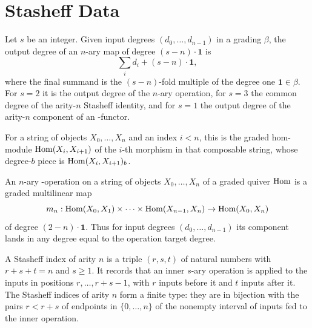 
\chapter{Stasheff Data}

\begin{definition}
\label{AInfinityTheory.targetDeg}
\leanok
{}
Let $s$ be an integer. Given input degrees $(d_0,\dots,d_{n-1})$ in a grading $\beta$, the
output degree of an $n$-ary map of degree $(s-n) \cdot \mathbf{1}$ is
\[
  \sum_i d_i + (s-n) \cdot \mathbf{1},
\]
where the final summand is the $(s-n)$-fold multiple of the degree one
$\mathbf{1} \in \beta$. For $s = 2$ it is the output degree of the $n$-ary operation, for
$s = 3$ the common degree of the arity-$n$ Stasheff identity, and for $s = 1$ the output degree
of the arity-$n$ component of an \Ainf{}-functor.
\end{definition}

\begin{definition}
\label{AInfinityTheory.GradedLinearQuiver.ComposableHom}
\leanok
{}
For a string of objects $X_0,\dots,X_n$ and an index $i < n$, this is the graded
hom-module $\operatorname{Hom}(X_i, X_{i+1})$ of the $i$-th morphism in that composable string,
whose degree-$b$ piece is $\operatorname{Hom}(X_i, X_{i+1})_b$.
\end{definition}

\begin{definition}
\label{AInfinityTheory.AInfinityOperation}
\leanok
{}
An $n$-ary \Ainf{}-operation on a string of objects $X_0,\dots,X_n$ of a graded
quiver $\operatorname{Hom}$ is a graded multilinear map
\[
  m_n : \operatorname{Hom}(X_0,X_1) \times \cdots \times \operatorname{Hom}(X_{n-1},X_n) \to \operatorname{Hom}(X_0,X_n)
\]
of degree $(2-n) \cdot \mathbf{1}$. Thus for input degrees
$(d_0,\dots,d_{n-1})$ its component lands in any degree equal to the operation
target degree.
\end{definition}

\begin{definition}
\label{AInfinityTheory.StasheffIndex}
\leanok
A Stasheff index of arity $n$ is a triple $(r,s,t)$ of natural numbers with
$r + s + t = n$ and $s \geq 1$. It records that an inner $s$-ary operation is
applied to the inputs in positions $r,\dots,r+s-1$, with $r$ inputs before it and
$t$ inputs after it. The Stasheff indices of arity $n$ form a finite type: they are
in bijection with the pairs $r < r + s$ of endpoints in $\{0,\dots,n\}$ of the
nonempty interval of inputs fed to the inner operation.
\end{definition}

